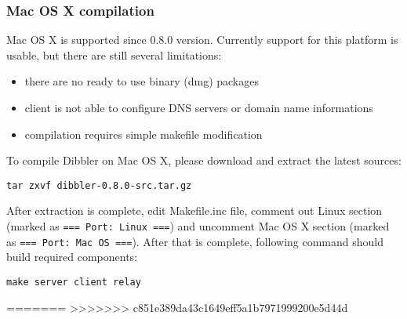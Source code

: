 \subsubsection{Mac OS X compilation}
\label{compile-macos}
Mac OS X is supported since 0.8.0 version. Currently support for this
platform is usable, but there are still several limitations:
\begin{itemize}
\item there are no ready to use binary (dmg) packages
\item client is not able to configure DNS servers or domain name
  informations
\item compilation requires simple makefile modification
\end{itemize}

To compile Dibbler on Mac OS X, please download and extract the latest
sources:
\begin{verbatim}
tar zxvf dibbler-0.8.0-src.tar.gz
\end{verbatim}
After extraction is complete, edit Makefile.inc file, comment out
Linux section (marked as \verb+=== Port: Linux ===+)
and uncomment Mac OS X section (marked as
\verb+=== Port: Mac OS ===+). After that is complete, following
command should build required components:

\begin{verbatim}
make server client relay
\end{verbatim}
=======
>>>>>>> c851e389da43c1649eff5a1b7971999200e5d44d
